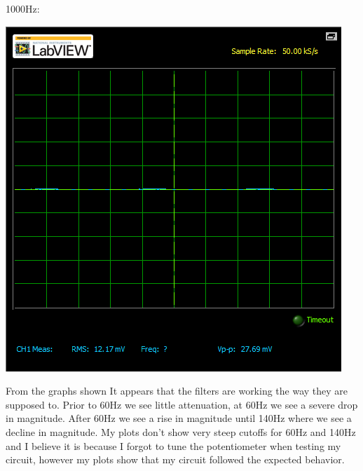 \documentclass[12pt,letterpaper,boxed]{hmcpset}
\begin{document}
\newpage
1000Hz:
\begin{center}
\includegraphics[scale=.8]{1000Hz}
\end{center}

From the graphs shown It appears that the filters are working the way they are supposed to. Prior to 60Hz we see little attenuation, at 60Hz we see a severe drop in magnitude. After 60Hz we see a rise in magnitude until 140Hz where we see a decline in magnitude. My plots don't show very steep cutoffs for 60Hz and 140Hz and I believe it is because I forgot to tune the potentiometer when testing my circuit, however my plots show that my circuit followed the expected behavior.
\end{document}
